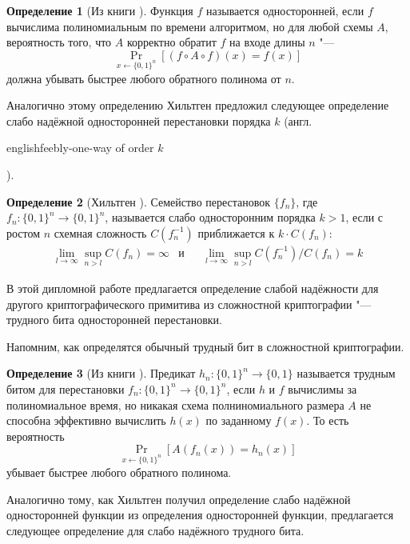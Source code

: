 \documentclass[oneside, a4paper]{article}
\theoremstyle{definition}
\newtheorem{definition}{Определение}
\theoremstyle{remark}
\begin{document}
\begin{definition}[Из книги \cite{goldreich}]
Функция $f$ называется односторонней, если $f$ вычислима полиномиальным по
времени алгоритмом, но для любой схемы $A$, вероятность того, что $A$ корректно
обратит $f$ на входе длины $n$ "---
\[
\Pr_{x \gets \{0, 1\}^n}[(f \circ A \circ f)(x) = f(x)]
\]
должна убывать быстрее любого обратного полинома от $n$.
\end{definition}

Аналогично этому определению Хильтген \cite{hiltgen_article} предложил
следующее определение слабо надёжной односторонней перестановки порядка
$k$ (англ. \begin{foreignlanguage}{english}feebly-one-way of order
$k$\end{foreignlanguage}).

\begin{definition}[Хильтген \cite{hiltgen_article}]
Семейство перестановок $\{f_n\}$, где $f_n : \{0, 1\}^n \to \{0, 1\}^n$,
называется слабо односторонним порядка $k > 1$, если с ростом $n$ схемная
сложность $C(f_n^{-1})$ приближается к $k \cdot C(f_n)$:
\[
\begin{aligned}
&\lim_{l \to \infty} \sup_{n > l} C(f_n) = \infty
&
\text{и}&
&
\lim_{l \to \infty} \sup_{n > l} C(f_n^{-1}) / C(f_n) = k&
\end{aligned}
\]
\end{definition}

В этой дипломной работе предлагается определение слабой надёжности для другого
криптографического примитива из сложностной криптографии "--- трудного бита
односторонней перестановки.

Напомним, как определятся обычный трудный бит в сложностной криптографии.

\begin{definition}[Из книги \cite{goldreich}]
Предикат $h_n : \{0, 1\}^n \to \{0, 1\}$ называется трудным битом для
перестановки $f_n : \{0, 1\}^n \to \{0, 1\}^n$, если $h$ и $f$ вычислимы за
полиномиальное время, но никакая схема полниномиального размера $A$ не способна
эффективно вычислить $h(x)$ по заданному $f(x)$. То есть вероятность
\[
\Pr_{x \gets \{0, 1\}^n}[A(f_n(x)) = h_n(x)]
\]
убывает быстрее любого обратного полинома.
\end{definition}

Аналогично тому, как Хильтген получил определение слабо надёжной односторонней
функции из определения односторонней функции, предлагается следующее определение
для слабо надёжного трудного бита.
\end{document}
